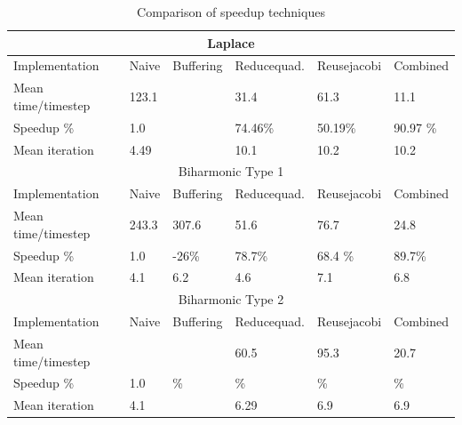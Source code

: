 \begin{table}[h!]
\centering
\caption{Comparison of speedup techniques}
\label{my-label}
\begin{tabular}{ |p{2.8cm}|p{2.2cm}|p{2.4cm}|p{2.4cm}|p{2.4cm}|p{2.4cm}| }
 \hline
  \multicolumn{6}{|c|}{Laplace} \\
 \hline
 Implementation       &Naive  & Buffering & Reducequad. & Reusejacobi & Combined \\
 \hline
 Mean time/timestep &  123.1    &  &  31.4 & 61.3  &  11.1 \\
 \hline
 Speedup \%            &  1.0         &  & 74.46\%     &  50.19\%     & 90.97 \%   \\
 \hline 
 Mean iteration         &  4.49       &  & 10.1  &  10.2  &  10.2 \\
 \hline 
  \hline
  \multicolumn{6}{|c|}{Biharmonic Type 1} \\
 \hline
 Implementation &Naive  & Buffering & Reducequad. & Reusejacobi & Combined \\
 \hline
 Mean time/timestep & 243.3 & 307.6  & 51.6 & 76.7  &  24.8 \\
 \hline
 Speedup \%    & 1.0     & -26\% & 78.7\%  & 68.4 \%  &  89.7\%   \\
 \hline
 Mean iteration & 4.1     &  6.2    &4.6&  7.1 &  6.8  \\
 \hline
  \hline
  \multicolumn{6}{|c|}{Biharmonic Type 2} \\
 \hline
 Implementation &Naive  & Buffering & Reducequad. & Reusejacobi & Combined \\
 \hline
 Mean time/timestep &        &            &   60.5   &   95.3     &  20.7  \\
 \hline
 Speedup \%             & 1.0  & \%     & \%          &  \%         &  \%   \\
 \hline
 Mean iteration           & 4.1 &           &  6.29     &   6.9        &  6.9  \\
 \hline 
\end{tabular}
\end{table}

